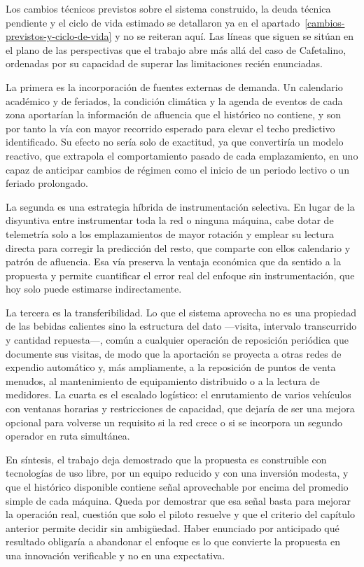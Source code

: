 Los cambios técnicos previstos sobre el sistema construido, la deuda técnica pendiente y el ciclo de vida estimado se detallaron ya en el apartado~\ref{cambios-previstos-y-ciclo-de-vida} y no se reiteran aquí. Las líneas que siguen se sitúan en el plano de las perspectivas que el trabajo abre más allá del caso de Cafetalino, ordenadas por su capacidad de superar las limitaciones recién enunciadas.

La primera es la incorporación de fuentes externas de demanda. Un calendario académico y de feriados, la condición climática y la agenda de eventos de cada zona aportarían la información de afluencia que el histórico no contiene, y son por tanto la vía con mayor recorrido esperado para elevar el techo predictivo identificado. Su efecto no sería solo de exactitud, ya que convertiría un modelo reactivo, que extrapola el comportamiento pasado de cada emplazamiento, en uno capaz de anticipar cambios de régimen como el inicio de un periodo lectivo o un feriado prolongado.

La segunda es una estrategia híbrida de instrumentación selectiva. En lugar de la disyuntiva entre instrumentar toda la red o ninguna máquina, cabe dotar de telemetría solo a los emplazamientos de mayor rotación y emplear su lectura directa para corregir la predicción del resto, que comparte con ellos calendario y patrón de afluencia. Esa vía preserva la ventaja económica que da sentido a la propuesta y permite cuantificar el error real del enfoque sin instrumentación, que hoy solo puede estimarse indirectamente.

La tercera es la transferibilidad. Lo que el sistema aprovecha no es una propiedad de las bebidas calientes sino la estructura del dato —visita, intervalo transcurrido y cantidad repuesta—, común a cualquier operación de reposición periódica que documente sus visitas, de modo que la aportación se proyecta a otras redes de expendio automático y, más ampliamente, a la reposición de puntos de venta menudos, al mantenimiento de equipamiento distribuido o a la lectura de medidores. La cuarta es el escalado logístico: el enrutamiento de varios vehículos con ventanas horarias y restricciones de capacidad, que dejaría de ser una mejora opcional para volverse un requisito si la red crece o si se incorpora un segundo operador en ruta simultánea.

En síntesis, el trabajo deja demostrado que la propuesta es construible con tecnologías de uso libre, por un equipo reducido y con una inversión modesta, y que el histórico disponible contiene señal aprovechable por encima del promedio simple de cada máquina. Queda por demostrar que esa señal basta para mejorar la operación real, cuestión que solo el piloto resuelve y que el criterio del capítulo anterior permite decidir sin ambigüedad. Haber enunciado por anticipado qué resultado obligaría a abandonar el enfoque es lo que convierte la propuesta en una innovación verificable y no en una expectativa.
